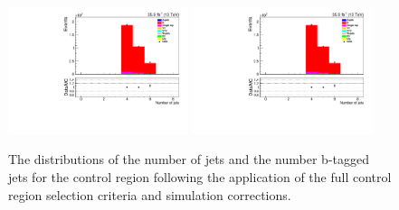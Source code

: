 \begin{figure}[htbp]
\centering
\includegraphics[width=0.47\textwidth]{figs/background-estimation/plots/unblinded/ttbar_control/numbJets_SingleTop_wMass_emu.pdf}
\includegraphics[width=0.47\textwidth]{figs/background-estimation/plots/unblinded/ttbar_control/numbJets_SingleTop_wMass_emu.pdf}
\caption{
The distributions of the number of jets and the number b-tagged jets for the \ttbar control region following the application of the full control region selection criteria and simulation corrections.
}
\label{fig:ttbarCR_nJets}
\end{figure}


